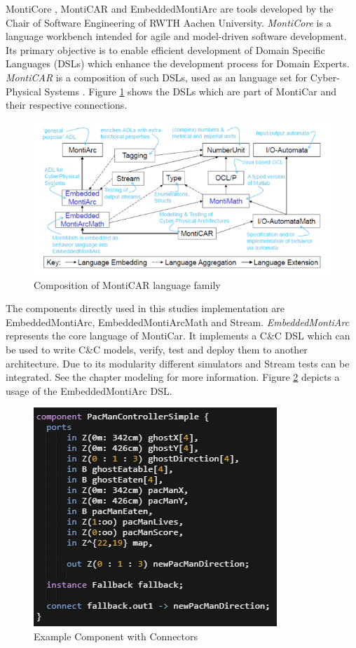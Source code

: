 MontiCore \cite{HR17}, MontiCAR \cite{KRRW17} and EmbeddedMontiArc \cite{HKK+18} are tools developed by the Chair of Software Engineering of RWTH Aachen University\cite{serwth}.
\emph{MontiCore} is a language workbench intended for agile and model-driven software development. Its primary objective is to enable efficient development of Domain Specific Languages (DSLs) which enhance the development process for Domain Experts. 
\emph{MontiCAR} is a composition of such DSLs, used as an language set for Cyber-Physical Systems \cite{seminarArmin}. Figure \ref{fig:MontiCAR} shows the DSLs which are part of MontiCar and their respective connections.
\begin{figure}
	\centering
	\includegraphics[width=\textwidth]{pictures/MontiCarOverview.PNG}
	\caption{Composition of MontiCAR language family\cite{seminarArmin}}
	\label{fig:MontiCAR}
\end{figure}
The components directly used in this studies implementation are EmbeddedMontiArc, EmbeddedMontiArcMath and Stream.
\emph{EmbeddedMontiArc} represents the core language of MontiCar. It implements a C\&C DSL which can be used to write C\&C models, verify, test and deploy them to another architecture. Due to its modularity different simulators and Stream tests can be integrated. See the chapter modeling for more information. Figure \ref{fig:EMontiArc} depicts a usage of the EmbeddedMontiArc DSL.

\begin{figure}[!h]
	\centering
	\includegraphics[scale=0.70]{pictures/EMA.PNG}
	\caption{Example Component with Connectors}
	\label{fig:EMontiArc}
\end{figure}

